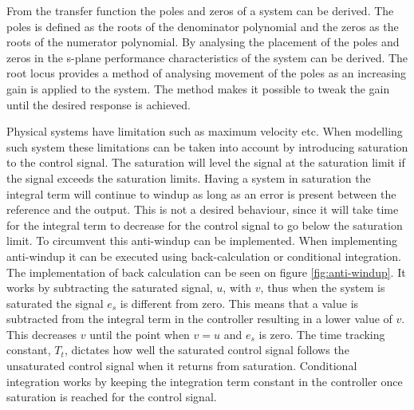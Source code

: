 \documentclass[../../main.tex]{subfiles}
\begin{document}
From the transfer function the poles and zeros of a system can be derived. The poles is defined as the roots of the denominator polynomial and the zeros as the roots of the numerator polynomial. By analysing the placement of the poles and zeros in the s-plane performance characteristics of the system can be derived. The root locus provides a method of analysing movement of the poles as an increasing gain is applied to the system. The method makes it possible to tweak the gain until the desired response is achieved.


Physical systems have limitation such as maximum velocity etc. When modelling such system these limitations can be taken into account by introducing saturation to the control signal. The saturation will level the signal at the saturation limit if the signal exceeds the saturation limits. Having a system in saturation the integral term will continue to windup as long as an error is present between the reference and the output. This is not a desired behaviour, since it will take time for the integral term to decrease for the control signal to go below the saturation limit. To circumvent this anti-windup can be implemented. %
When implementing anti-windup it can be executed using back-calculation or conditional integration. The implementation of back calculation can be seen on figure \ref{fig:anti-windup}. It works by subtracting the saturated signal, $u$, with $v$, thus when the system is saturated the signal $e_s$ is different from zero. This means that a value is subtracted from the integral term in the controller resulting in a lower value of $v$. This decreases $v$ until the point when $v=u$ and $e_s$ is zero. The time tracking constant, $T_t$, dictates how well the saturated control signal follows the unsaturated control signal when it returns from saturation. Conditional integration works by keeping the integration term constant in the controller once saturation is reached for the control signal. 
\end{document}
